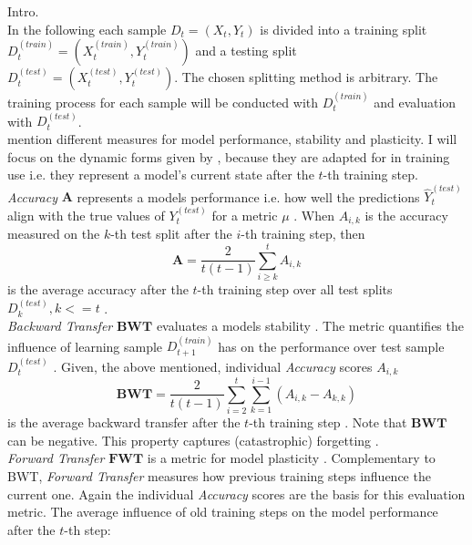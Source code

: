 Intro.\\
In the following each sample $D_t = (X_t, Y_t)$ is divided into a training split $D_t^{(train)} = (X_t^{(train)}, Y_t^{(train)})$ and a testing split $D_t^{(test)} = (X_t^{(test)}, Y_t^{(test)})$. The chosen splitting method is arbitrary. The training process for each sample will be conducted with $D_t^{(train)}$ and evaluation with $D_t^{(test)}$.\\
\cite{LW} mention different measures for model performance, stability and plasticity. I will focus on the dynamic forms given by \cite{díazrodríguez2018dontforgetforgettingnew}, because they are adapted for in training use i.e. they represent a model's current state after the $t$-th training step.\\
\textit{Accuracy} $\mathbf{A}$ represents a models performance i.e. how well the predictions $\hat{Y}_t^{(test)}$ align with the true values of $Y_t^{(test)}$ for a metric $\mu$ . When $A_{i,k}$ is the accuracy measured on the $k$-th test split after the $i$-th training step, then
\begin{equation}
	\mathbf{A} = \frac{2}{t(t-1)}\sum_{i \geq k }^{t} A_{i,k}
\end{equation}
is the average accuracy after the $t$-th training step over all test splits $D_k^{(test)}, k <= t$ \cite{díazrodríguez2018dontforgetforgettingnew}.\\
\textit{Backward Transfer} $\mathbf{BWT}$ evaluates a models stability \cite{LW}. The metric quantifies the influence of learning sample $D_{t+1}^{(train)}$ has on the performance over test sample $D_t^{(test)}$ \cite{lopezpaz2022gradientepisodicmemorycontinual}. Given, the above mentioned, individual \textit{Accuracy} scores $A_{i,k}$
\begin{equation}
	\mathbf{BWT} = \frac{2}{t(t-1)} \sum_{i=2}^{t}\sum_{k=1}^{i-1}(A_{i,k}-A_{k,k})
\end{equation}
is the average backward transfer after the $t$-th training step \cite{díazrodríguez2018dontforgetforgettingnew}. Note that $\mathbf{BWT}$ can be negative. This property captures (catastrophic) forgetting \cite{LW}.\\
\textit{Forward Transfer} $\mathbf{FWT}$ is a metric for model plasticity \cite{LW}. Complementary to BWT, \textit{Forward Transfer} measures how previous training steps influence the current one. Again the individual \textit{Accuracy} scores are the basis for this evaluation metric. The average influence of old training steps on the model performance after the $t$-th step:
